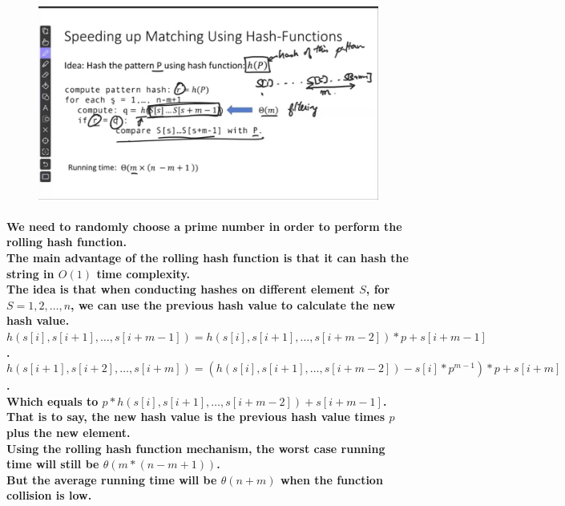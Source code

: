 \documentclass{article}
\begin{document}
\begin{figure}[H]
    \includegraphics[width=\textwidth]{stringmatchingusinghash.png}
\end{figure}

\paragraph{
    We need to randomly choose a prime number in order to perform the rolling hash function.\\
    The main advantage of the rolling hash function is that it can hash the string in $O(1)$ time complexity.\\
    The idea is that when conducting hashes on different element $S$, for $S = 1, 2, \ldots, n$, 
    we can use the previous hash value to calculate the new hash value.\\
    $h(s[i], s[i+1], \ldots, s[i+m-1]) = h(s[i], s[i+1], \ldots, s[i+m-2]) * p + s[i+m-1]$.\\
    $h(s[i+1], s[i+2], \ldots, s[i+m]) = (h(s[i], s[i+1], \ldots, s[i+m-2]) - s[i]*p^{m-1})*p + s[i+m]$.\\
    Which equals to $p * h(s[i], s[i+1], \ldots, s[i+m-2]) + s[i+m-1]$.\\
    That is to say, the new hash value is the previous hash value times $p$ plus the new element.\\
    Using the rolling hash function mechanism, the worst case running time will still be $\theta(m*(n-m+1))$.\\
    But the average running time will be $\theta(n+m)$ when the function collision is low.\\
}
\end{document}

